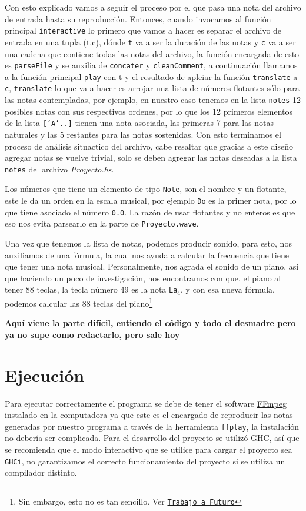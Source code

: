 \documentclass[10pt,a4paper]{article}
\begin{document}
Con esto explicado vamos a seguir el proceso por el que pasa una nota del archivo
de entrada hasta su reproducción. Entonces, cuando invocamos al función principal
\texttt{interactive} lo primero que vamos a hacer es separar el archivo de
entrada en una tupla (t,c), dónde \texttt{t} va a ser la duración de las notas y
\texttt{c} va a ser una cadena que contiene todas las notas del archivo, la
función encargada de esto es \texttt{parseFile} y se auxilia de
\texttt{concater} y \texttt{cleanComment}, a continuación llamamos a la función
principal \texttt{play} con t y el resultado de aplciar la función
\texttt{translate} a \texttt{c}, \texttt{translate} lo que va a hacer es arrojar
una lista de números flotantes sólo para las notas contempladas, por ejemplo, en
nuestro caso tenemos en la lista \texttt{notes} 12 posibles notas con sus
respectivos ordenes, por lo que los 12 primeros elementos de la lista
\texttt{['A'..]} tienen una nota asociada, las primeras 7 para las notas
naturales y las 5 restantes para las notas sostenidas. Con esto terminamos el
proceso de análisis sitnactico del archivo, cabe resaltar que gracias a este
diseño agregar notas se vuelve trivial, solo se deben agregar las notas deseadas
a la lista \texttt{notes} del archivo \textit{Proyecto.hs}.

Los números que tiene un elemento de tipo \texttt{Note}, son el nombre y un
flotante, este le da un orden en la escala musical, por ejemplo \texttt{Do} es la
primer nota, por lo que tiene asociado el número \texttt{0.0}. La razón de usar
flotantes y no enteros es que eso nos evita parsearlo en la parte de
\texttt{Proyecto.wave}.

Una vez que tenemos la lista de notas, podemos producir sonido, para esto, nos
auxiliamos de una fórmula\cite{formula}, la cual nos ayuda a calcular la
frecuencia que tiene que tener una nota musical. Personalmente, nos agrada el
sonido de un piano, así que haciendo un poco de investigación, nos encontramos
con que, el piano al tener 88 teclas, la tecla número 49 es la nota
\texttt{La$_{4}$}, y con esa nueva fórmula, podemos calcular las 88 teclas del
piano\footnote{Sin embargo, esto no es tan sencillo. Ver
  \texttt{\hyperref[sec:TaF]{Trabajo a Futuro}}}






\textbf{Aquí viene la parte difícil, entiendo el código y todo el desmadre pero ya no supe como redactarlo, pero sale hoy}

\section{Ejecución}
\noindent Para ejecutar correctamente el programa se debe de tener el software
\href{https://ffmpeg.org/}{FFmpeg} instalado en la computadora ya que este es el
encargado de reproducir las notas generadas por nuestro programa a través de la
herramienta \texttt{ffplay}, la instalación no debería ser complicada. Para el
desarrollo del proyecto se utilizó \href{https://www.haskell.org/ghc/}{GHC}, así
que se recomienda que el modo interactivo que se utilice para cargar el proyecto
sea \texttt{GHCi}, no garantizamos el correcto funcionamiento del proyecto si se
utiliza un compilador distinto.
\end{document}
